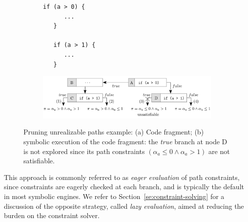 \begin{figure}[t]
  \begin{subfigure}{.29\textwidth}
    \vspace{0mm}
    \begin{lstlisting}[basicstyle=\ttfamily\scriptsize]
   if (a > 0) {
      ...
   } 

   if (a > 1) {
      ...
   }
    \end{lstlisting}
    \vspace{-0.7mm}
    \caption{}
  \end{subfigure}%
  \begin{subfigure}{.70\textwidth}
    \centering
    \includegraphics[width=1.0\columnwidth]{images/eager-evaluation} 
    \vspace{-5mm}
    \caption{}
  \end{subfigure}%
  \vspace{-2mm}
  \caption{Pruning unrealizable paths example: (a) Code fragment; (b) symbolic execution of the code fragment: the {\em true} branch at node D is not explored since its path constraints $(\alpha_a \leq 0 \wedge \alpha_a > 1)$ are not satisfiable.}
  \label{fig:eager-evaluation}
\end{figure}

This approach is commonly referred to as {\em eager evaluation} of path constraints, since constraints are eagerly checked at each branch, and is typically the default in most symbolic engines. We refer to Section~\ref{se:constraint-solving} for a discussion of the opposite strategy, called {\em lazy evaluation}, aimed at reducing the burden on the constraint solver.


